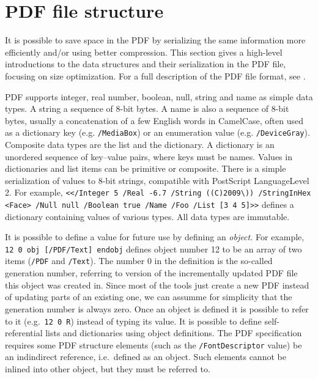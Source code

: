 \documentclass{article}
\begin{document}
\section{PDF file structure}

It is possible to save space in the PDF by serializing the same information
more efficiently and/or using better compression. This section gives a
high-level introductions to the data structures and their serialization in
the PDF file, focusing on size optimization. For a full description of the
PDF file format, see \cite{pdfref}.

PDF supports integer, real number, boolean, null, string and name as
simple data types. A string a sequence of 8-bit bytes. A name is also a
sequence of 8-bit bytes, usually a concatenation of a few English words in
CamelCase, often used as a dictionary key (e.g. \texttt{/MediaBox}) or an
enumeration value (e.g. \texttt{/DeviceGray}). Composite data types are the
list and the dictionary. A dictionary is an unordered sequence of key--value
pairs, where keys must be names. Values in dictionaries and list items can
be primitive or composite. There is a simple serialization of values to
8-bit strings, compatible with PostScript LanguageLevel\,2. For example,
\texttt{\hbox{<}</Integer 5 /Real -6.7 /String ((C)2009\textbackslash))
/StringInHex <Face> /Null null
/Boolean true /Name /Foo /List [3 4 5]\hbox{>}>} defines a dictionary
containing values of various types. All data types are immutable.

It is possible to define a value for future use by defining an
\emph{object.} For example, \texttt{12 0 obj [/PDF/Text] endobj} defines
object number 12 to be an array of two items (\texttt{/PDF} and
\texttt{/Text}). The number 0 in the definition is the so-called generation
number, referring to version of the incrementally updated PDF file this
object was created in. Since most of the tools just create a new PDF instead
of updating parts of an existing one, we can assumme for simplicity that the
generation number is always zero. Once an object is defined it is possible
to refer to it (e.g.\ \texttt{12 0 R}) instead of typing its value. It is
possible to define self-referential lists and dictionaries using object
definitions. The PDF specification requires some PDF structure elements
(such as the \texttt{/FontDescriptor} value) be an indindirect reference,
i.e.\ defined as an object. Such elements cannot be inlined into other
object, but they must be referred to.
\end{document}
